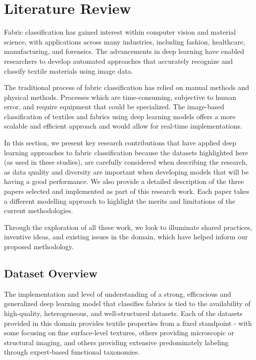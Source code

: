 \section{Literature Review}

Fabric classification has gained interest within computer vision and material science, with applications across many industries, including fashion, healthcare, manufacturing, and forensics. The advancements in deep learning have enabled researchers to develop automated approaches that accurately recognize and classify textile materials using image data. 

The traditional process of fabric classification has relied on manual methods and physical methods. Processes which are time-consuming, subjective to human error, and require equipment that could be specialized. The image-based classification of textiles and fabrics using deep learning models offers a more scalable and efficient approach and would allow for real-time implementations. 

In this section, we present key research contributions that have applied deep learning approaches to fabric classification because the datasets highlighted here (as used in these studies), are carefully considered when describing the research, as data quality and diversity are important when developing models that will be having a good performance. We also provide a detailed description of the three papers selected and implemented as part of this research work. Each paper takes a different modelling approach to highlight the merits and limitations of the current methodologies.

Through the exploration of all these work, we look to illuminate shared practices, inventive ideas, and existing issues in the domain, which have helped inform our proposed methodology.

\subsection{Dataset Overview}

The implementation and level of understanding of a strong, efficacious and generalized deep learning model that classifies fabrics is tied to the availability of high-quality, heterogeneous, and well-structured datasets. Each of the datasets provided in this domain provides textile properties from a fixed standpoint - with some focusing on fine surface-level textures, others providing microscopic or structural imaging, and others providing extensive predominately labeling through expert-based functional taxonomies.

